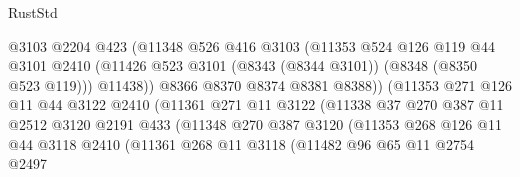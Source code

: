 \begin{lexlean}{RustStd}
\begin{coremodule}
                              @3103
                              @2204
                              @423
                              (@11348
                                @526
                                @416
                                @3103
                                (@11353
                                  @524
                                  @126
                                  @119
                                  @44
                                  @3101
                                  @2410
                                  (@11426
                                    @523
                                    @3101
                                    (@8343 (@8344 @3101))
                                    (@8348 (@8350 @523 @119)))
                                  @11438))
                              @8366
                              @8370
                              @8374
                              @8381
                              @8388))
                          (@11353
                            @271
                            @126
                            @11
                            @44
                            @3122
                            @2410
                            (@11361
                              @271
                              @11
                              @3122
                              (@11338
                                @37
                                @270
                                @387
                                @11
                                @2512
                                @3120
                                @2191
                                @433
                                (@11348
                                  @270
                                  @387
                                  @3120
                                  (@11353
                                    @268
                                    @126
                                    @11
                                    @44
                                    @3118
                                    @2410
                                    (@11361
                                      @268
                                      @11
                                      @3118
                                      (@11482
                                        @96
                                        @65
                                        @11
                                        @2754
                                        @2497

\end{coremodule}
\end{lexlean}
